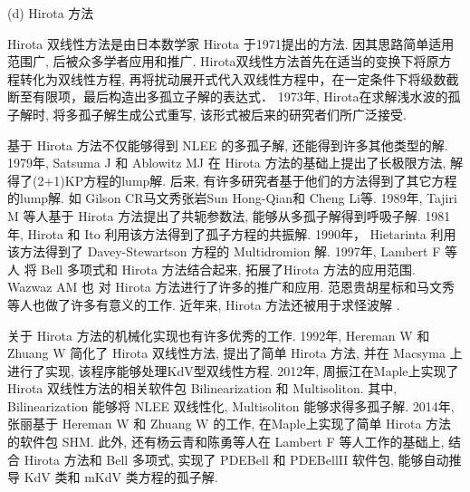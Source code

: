 (d) Hirota 方法

Hirota 双线性方法是由日本数学家 Hirota 于1971提出的方法\cite{hirota1971exact}. 因其思路简单\D 适用范围广, 后被众多学者应用和推广. Hirota双线性方法首先在适当的变换下将原方程转化为双线性方程, 再将扰动展开式代入双线性方程中，在一定条件下将级数截断至有限项，最后构造出多孤立子解的表达式． 1973年, Hirota\cite{hirota1973exact}在求解浅水波的孤子解时, 将多孤子解生成公式重写, 该形式被后来的研究者们所广泛接受. 

基于 Hirota 方法不仅能够得到 NLEE 的多孤子解, 还能得到许多其他类型的解. 1979年, Satsuma J 和 Ablowitz MJ 在 Hirota \cite{satsuma1979two}方法的基础上提出了长极限方法, 解得了(2+1)KP\cite{kadomtsev1970stability}方程的lump解. 后来, 有许多研究者基于他们的方法得到了其它方程的lump解. 如 Gilson CR\cite{gilson1990lump}\D 马文秀\cite{ma2015lump,zhang2017lump,chen2018lump}\D 张岩\cite{zhangYTSF,zhang2018m}\D Sun Hong-Qian\cite{sun2017lump}\D 和 Cheng Li\cite{cheng2017lump}等. 1989年, Tajiri M 等人\cite{tajiri1989breather}基于 Hirota 方法提出了共轭参数法, 能够从多孤子解得到呼吸子解. 1981年, Hirota 和 Ito \cite{hirota1983resonance}利用该方法得到了孤子方程的共振解. 1990年， Hietarinta \cite{hietarinta1990multidromion}利用该方法得到了 Davey-Stewartson 方程的 Multidromion 解. 1997年, Lambert F 等人\cite{gilson1996combinatorics,lambert1997construction,lambert2008soliton} 将 Bell 多项式和 Hirota 方法结合起来, 拓展了Hirota 方法的应用范围. Wazwaz AM 也\cite{wazwaz2008multiple,wazwaz2008integrable,wazwaz2009multiple,wazwaz20102,wazwaz2010multiple,wazwaz2012multiple} 对 Hirota 方法进行了许多的推广和应用. 范恩贵\cite{fan2011new}\D 胡星标\cite{hu1999soliton,hu2002application,hirota2003vector}和马文秀\cite{ma2011linear}等人也做了许多有意义的工作. 近年来, Hirota 方法还被用于求怪波解 \cite{guo2011rogue,sun2018general,zhaqilao2018symbolic}.

关于 Hirota 方法的机械化实现也有许多优秀的工作. 1992年, Hereman W 和 Zhuang W \cite{hereman1992symbolic,hereman1991macsyma} 简化了 Hirota 双线性方法, 提出了简单 Hirota 方法, 并在 Macsyma 上进行了实现, 该程序能够处理KdV型双线性方程. 2012年, 周振江\cite{zhou2012}在Maple上实现了 Hirota 双线性方法的相关软件包 Bilinearization 和 Multisoliton. 其中, Bilinearization 能够将 NLEE 双线性化, Multisoliton 能够求得多孤子解. 2014年, 张丽\cite{zhang2014}基于 Hereman W 和 Zhuang W 的工作, 在Maple上实现了简单 Hirota 方法的软件包 SHM. 此外, 还有杨云青和陈勇等人\cite{yang2011,miao2014pdebellii}在 Lambert F 等人工作的基础上, 结合 Hirota 方法和 Bell 多项式, 实现了 PDEBell 和 PDEBellII 软件包, 能够自动推导 KdV 类和 mKdV 类方程的孤子解. 

